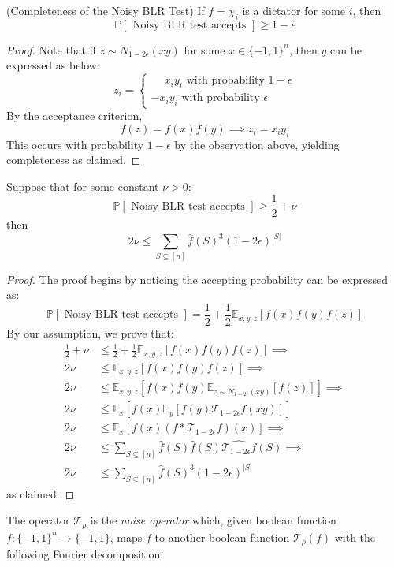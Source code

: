 \begin{lemma} (Completeness of the Noisy BLR Test)
 If $f = \chi_{i}$ is a dictator for some $i$, then
  \[ \mathbb{P}[\text{ Noisy BLR test accepts }] \geq 1 - \epsilon \]
\end{lemma}
\begin{proof}
  Note that if $z \sim N_{1-2\epsilon}(xy)$ for some $x \in \{-1,1\}^n$, then $y$ can be expressed as below:
  \begin{equation}
    z_i = \begin{cases}
             \phantom{-} x_iy_i \text{ with probability } 1- \epsilon \\
             - x_iy_i \text{ with probability } \epsilon
          \end{cases}
  \end{equation}
  By the acceptance criterion,
  \[ f(z) = f(x)f(y) \implies z_i = x_iy_i \]
  This occurs with probability $1- \epsilon$ by the observation above, yielding completeness as claimed.
\end{proof}
%
%
\begin{lemma} Suppose that for some constant $\nu > 0$: \label{noisyblrsoundness}
\begin{equation*}
  \mathbb{P}[\text{ Noisy BLR test accepts }] \geq \frac{1}{2} + \nu
\end{equation*} then
\begin{equation}
  2\nu \leq \sum_{S \subseteq [n]} \hat{f}(S)^3(1-2\epsilon)^{|S|}
\end{equation}
\end{lemma}
%
\begin{proof}
  The proof begins by noticing the accepting probability can be expressed as:
  \[ \mathbb{P}[\text{ Noisy BLR test accepts }] = \frac{1}{2} + \frac{1}{2}\mathbb{E}_{x,y,z} \left[f(x)f(y)f(z) \right] \]
  By our assumption, we prove that:
  \begin{align*}
    \frac{1}{2} + \nu & \leq \frac{1}{2} + \frac{1}{2}\mathbb{E}_{x,y,z} \left[f(x)f(y)f(z) \right] \implies \\[0.7ex]
    2\nu & \leq \mathbb{E}_{x,y,z} \left[f(x)f(y)f(z) \right] \implies \\[0.7ex]
    2\nu & \leq\mathbb{E}_{x,y,z} \left[f(x)f(y) \mathbb{E}_{z \sim N_{1 - 2\epsilon}(xy)} \left[f(z)\right]\right] \implies \\[0.7ex]
    2\nu & \leq \mathbb{E}_{x}\left[ f(x)\mathbb{E}_{y}\left[ f(y)\mathcal{T}_{1-2\epsilon}f(xy)\right]\right] \\[0.7ex]
    2\nu & \leq \mathbb{E}_{x}\left[ f(x) (f * \mathcal{T}_{1-2\epsilon}f)(x)\right] \implies\\[0.7ex]
    2\nu & \leq \sum_{S \subseteq [n]} \widehat{f}(S)\widehat{f}(S)\widehat{\mathcal{T}_{1-2\epsilon}f}(S) \implies \\[0.7ex]
    2\nu & \leq  \sum_{S \subseteq [n]} \widehat{f}(S)^3 (1-2\epsilon)^{|S|}
  \end{align*}
  as claimed.
\end{proof}
The operator $\mathcal{T}_{\rho}$ is the \emph{noise operator} which, given boolean function $f:\{-1,1\}^n \rightarrow \{-1,1\}$, maps $f$ to another boolean function $\mathcal{T}_\rho(f)$ with the following Fourier decomposition:

